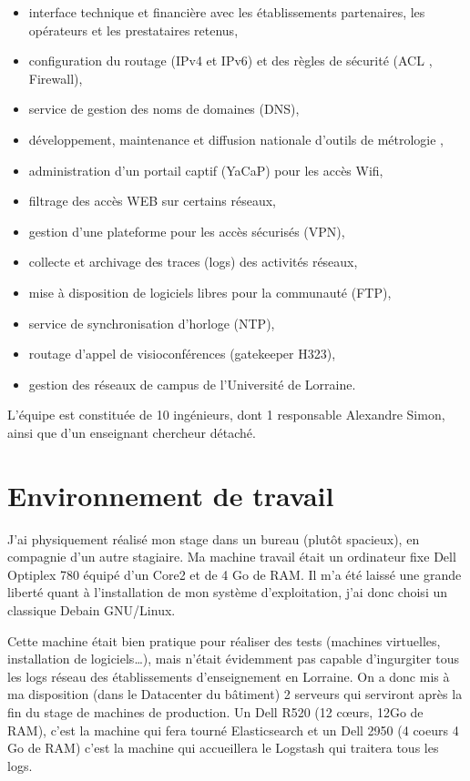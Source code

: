 \documentclass[a4paper,12pt,one side,titlepage]{report}
\begin{document}
\begin{itemize}
    \item interface technique et financière avec les établissements partenaires, 
    les opérateurs et les prestataires retenus,
    \item configuration du routage (IPv4 et IPv6) et des règles de sécurité (ACL , 
    Firewall),
    \item service de gestion des noms de domaines (DNS),
    \item développement, maintenance et diffusion nationale d’outils de métrologie ,
    \item administration d’un portail captif (YaCaP) pour les accès Wifi,
    \item filtrage des accès WEB sur certains réseaux,
    \item gestion d’une plateforme pour les accès sécurisés (VPN),
    \item collecte et archivage des traces (logs) des activités réseaux,
    \item mise à disposition de logiciels libres pour la communauté (FTP),
    \item service de synchronisation d’horloge (NTP),
    \item routage d’appel de visioconférences (gatekeeper H323),
    \item gestion des réseaux de campus de l’Université de Lorraine.
\end{itemize}                                                

L'équipe est constituée de 10 ingénieurs, dont 1 responsable Alexandre Simon, ainsi
que d'un enseignant chercheur détaché.


\section{Environnement de travail}
J'ai physiquement réalisé mon stage dans un bureau (plutôt spacieux), en compagnie
d'un autre stagiaire.
Ma machine travail était un ordinateur fixe Dell Optiplex 780 équipé d'un Core2 et 
de 4 Go de RAM. Il m'a été laissé une grande liberté quant à l'installation de mon
système d'exploitation, j'ai donc choisi un classique Debain GNU/Linux.

Cette machine était bien pratique pour réaliser des tests (machines virtuelles, 
installation de logiciels\ldots), mais n'était évidemment pas capable d'ingurgiter 
tous les logs réseau des établissements d'enseignement en Lorraine. On a donc mis 
à ma disposition (dans le Datacenter du bâtiment) 2 serveurs qui serviront après 
la fin du stage de machines de production. Un Dell R520 (12 cœurs, 12Go de RAM),
c'est la machine qui fera tourné Elasticsearch et un Dell 2950 (4 coeurs 4 Go de RAM)
c'est la machine qui accueillera le Logstash qui traitera tous les logs.
\end{document}
